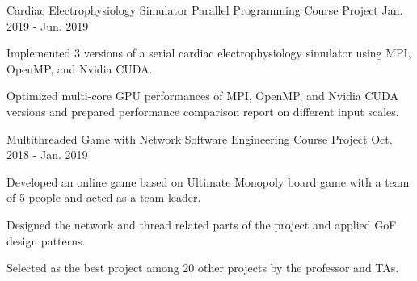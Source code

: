 \begin{cventries}
{\begin{cvitems}
      \end{cvitems}
    }
\cvopenentry
   {Cardiac Electrophysiology Simulator} %
    {Parallel Programming Course Project} %
    {} %
    {Jan. 2019 - Jun. 2019} %
    {
      \begin{cvitems} %
      	\item {Implemented 3 versions of a serial cardiac electrophysiology simulator using MPI, OpenMP, and Nvidia CUDA.}
      	\item {Optimized multi-core GPU performances of MPI, OpenMP, and Nvidia CUDA versions and prepared performance comparison report on different input scales.}
      \end{cvitems}
    }
\cvopenentry
   {Multithreaded Game with Network} %
    {Software Engineering Course Project} %
    {} %
    {Oct. 2018 - Jan. 2019} %
    {
      \begin{cvitems} %
      	\item {Developed an online game based on Ultimate Monopoly board game with a team of 5 people and acted as a team leader.} 
      	\item {Designed the network and thread related parts of the project and applied GoF design patterns.} 
      	\item {Selected as the best project among 20 other projects by the professor and TAs.} 
      \end{cvitems}
    }

\end{cventries}
